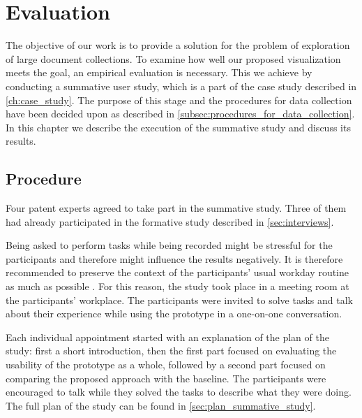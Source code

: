 
\chapter{Evaluation}
\label{ch:evaluation}

The objective of our work is to provide a solution for the problem of exploration of large document collections.
To examine how well our proposed visualization meets the goal, an empirical evaluation is necessary.
This we achieve by conducting a summative user study, which is a part of the case study described in \autoref{ch:case_study}.
The purpose of this stage and the procedures for data collection have been decided upon as described in \autoref{subsec:procedures_for_data_collection}.
In this chapter we describe the execution of the summative study and discuss its results.

\section{Procedure}
\label{sec:procedure}

Four patent experts agreed to take part in the summative study.
Three of them had already participated in the formative study described in \autoref{sec:interviews}.

Being asked to perform tasks while being recorded might be stressful for the participants and therefore might influence the results negatively.
It is therefore recommended to preserve the context of the participants' usual workday routine as much as possible \cite{Portigal2013}.
For this reason, the study took place in a meeting room at the participants' workplace.
The participants were invited to solve tasks and talk about their experience while using the prototype in a one-on-one conversation.

Each individual appointment started with an explanation of the plan of the study: first a short introduction, then the first part focused on evaluating the usability of the prototype as a whole, followed by a second part focused on comparing the proposed approach with the baseline. 
The participants were encouraged to talk while they solved the tasks to describe what they were doing. 
The full plan of the study can be found in \autoref{sec:plan_summative_study}.

